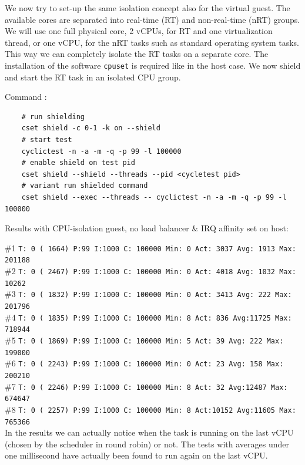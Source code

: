 \documentclass[]{scrartcl}
\begin{document}
We now try to set-up the same isolation concept also for the virtual guest. The available cores are separated into real-time (RT) and non-real-time (nRT) groups. 
We will use one full physical core, 2 vCPUs, for RT and one virtualization thread, or one vCPU, for the nRT tasks such as standard operating system tasks. 
This way we can completely isolate the RT tasks on a separate core. The installation of the software \texttt{cpuset} is required like in the host case. We now shield and start the RT task in an isolated CPU group. 

\noindent Command : 

\begin{verbatim}
	# run shielding
	cset shield -c 0-1 -k on --shield
	# start test
	cyclictest -n -a -m -q -p 99 -l 100000
	# enable shield on test pid
	cset shield --shield --threads --pid <cycletest pid>
	# variant run shielded command
	cset shield --exec --threads -- cyclictest -n -a -m -q -p 99 -l 100000
\end{verbatim}

\noindent Results with CPU-isolation guest, no load balancer \& IRQ affinity set on host:

\noindent \#1 \small \texttt{T: 0 ( 1664) P:99 I:1000 C: 100000 Min: 0 Act: 3037 Avg: 1913 Max:  201188}\\
\noindent \#2 \small \texttt{T: 0 ( 2467) P:99 I:1000 C: 100000 Min:      0 Act: 4018 Avg: 1032 Max:   10262}\\
\noindent \#3 \small \texttt{T: 0 ( 1832) P:99 I:1000 C: 100000 Min:      0 Act: 3413 Avg:  222 Max:  201796}\\
\noindent \#4 \small \texttt{T: 0 ( 1835) P:99 I:1000 C: 100000 Min:      8 Act:  836 Avg:11725 Max:  718944}\\
\noindent \#5 \small \texttt{T: 0 ( 1869) P:99 I:1000 C: 100000 Min:      5 Act:   39 Avg:  222 Max:  199000}\\
\noindent \#6 \small \texttt{T: 0 ( 2243) P:99 I:1000 C: 100000 Min:      0 Act:   23 Avg:  158 Max:  200210}\\
\noindent \#7 \small \texttt{T: 0 ( 2246) P:99 I:1000 C: 100000 Min:      8 Act:   32 Avg:12487 Max:  674647}\\
\noindent \#8 \small \texttt{T: 0 ( 2257) P:99 I:1000 C: 100000 Min:      8 Act:10152 Avg:11605 Max:  765366}\\

In the results we can actually notice when the task is running on the last vCPU (chosen by the scheduler in round robin) or not. The tests with averages under one millisecond have actually been found to run again on the last vCPU. 
\end{document}
